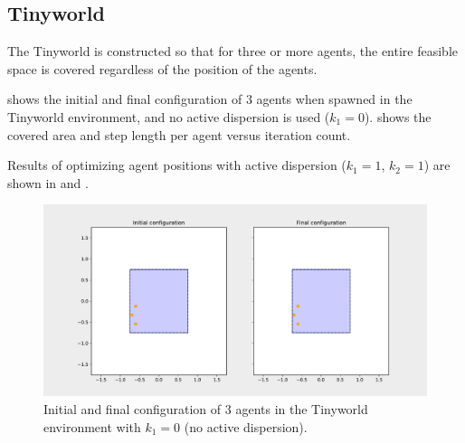 \subsection{Tinyworld}\label{secc:tinyworld}
The Tinyworld is constructed so that for three or more agents, the entire feasible space is covered regardless of the position of the agents.

 shows the initial and final configuration of 3 agents when spawned in the Tinyworld environment, 
and no active dispersion is used ($k_{1} = 0$).
 shows the covered area and step length per agent versus iteration count.

Results of optimizing agent positions with active dispersion ($k_{1} = 1$, $k_{2} = 1$) are shown in  and .

\begin{figure}[H]
  \centering
  \includegraphics[width=\textwidth]{figs/tinyworld_3_agnt_k_1_0_k_2_1_distr.pdf}
  \caption{Initial and final configuration of 3 agents in the Tinyworld environment with $k_{1} = 0$ (no active dispersion).}
  \label{fig:3_agnt_tw_k_1_0_distr}
\end{figure}

